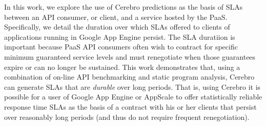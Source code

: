 In this work, we
explore the use of Cerebro predictions as the basis of SLAs between an API
consumer, or client,
and a service hosted by the PaaS.  Specifically, we detail the duration
over which SLAs offered to clients of applications running in Google App
Engine persist.  The SLA duratiion is important because PaaS API consumers
often
wish to contract for specific minimum guaranteed service levels and must
renegotiate when those guarantees expire or can no longer be sustained.  
This work demonstrates that, using a combination of on-line API benchmarking
and static program analysis, Cerebro can generate SLAs that are
\textit{durable} over long periods.  That is, using Cerebro it is possible for
a user of Google App Engine or AppScale to offer statistically
reliable response time SLAs as the basis of a contract with his or her clients
that persist over reasonably long periods (and thus do not require frequent
renegotiation).


